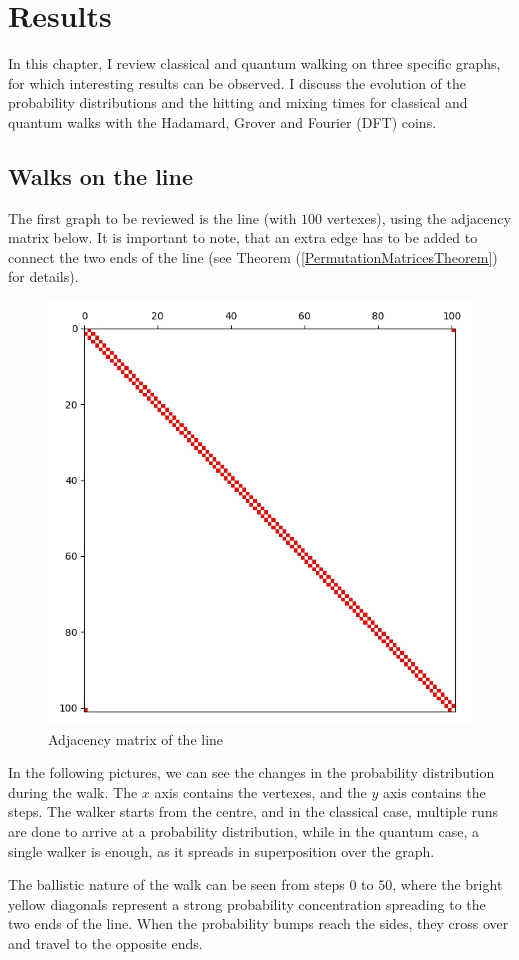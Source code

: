 \chapter{Results}

In this chapter, I review classical and quantum walking on three specific graphs, for which interesting results can be observed. I discuss the evolution of the probability distributions and the hitting and mixing times for classical and quantum walks with the Hadamard, Grover and Fourier (DFT) coins.

\section{Walks on the line}

The first graph to be reviewed is the line (with $100$ vertexes), using the adjacency matrix below. It is important to note, that an extra edge has to be added to connect the two ends of the line (see Theorem (\ref{PermutationMatricesTheorem}) for details).

\begin{figure}[H]
\centering
\includegraphics[width=0.5\linewidth]{./figures/results/path/graph.jpg}
\caption{Adjacency matrix of the line}
\end{figure}

In the following pictures, we can see the changes in the probability distribution during the walk. The $x$ axis contains the vertexes, and the $y$ axis contains the steps. The walker starts from the centre, and in the classical case, multiple runs are done to arrive at a probability distribution, while in the quantum case, a single walker is enough, as it spreads in superposition over the graph.

The ballistic nature of the walk can be seen from steps $0$ to $50$, where the bright yellow diagonals represent a strong probability concentration spreading to the two ends of the line. When the probability bumps reach the sides, they cross over and travel to the opposite ends.

